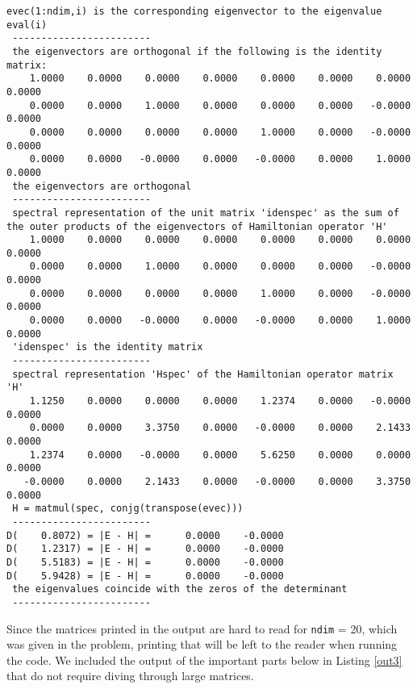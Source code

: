 \documentclass[12pt]{article}
\begin{document}
\begin{lstlisting}[frame=single,caption={Output of {\tt Fortran 90} Code {\tt hrmosc.f90} with {\tt ndim} = 4, {\tt Mass} = 2, and {\tt Omega} = $\sqrt{2}$},label=out2]
 evec(1:ndim,i) is the corresponding eigenvector to the eigenvalue eval(i)
 ------------------------
 the eigenvectors are orthogonal if the following is the identity matrix:
    1.0000    0.0000    0.0000    0.0000    0.0000    0.0000    0.0000    0.0000
    0.0000    0.0000    1.0000    0.0000    0.0000    0.0000   -0.0000    0.0000
    0.0000    0.0000    0.0000    0.0000    1.0000    0.0000   -0.0000    0.0000
    0.0000    0.0000   -0.0000    0.0000   -0.0000    0.0000    1.0000    0.0000
 the eigenvectors are orthogonal
 ------------------------
 spectral representation of the unit matrix 'idenspec' as the sum of the outer products of the eigenvectors of Hamiltonian operator 'H'
    1.0000    0.0000    0.0000    0.0000    0.0000    0.0000    0.0000    0.0000
    0.0000    0.0000    1.0000    0.0000    0.0000    0.0000   -0.0000    0.0000
    0.0000    0.0000    0.0000    0.0000    1.0000    0.0000   -0.0000    0.0000
    0.0000    0.0000   -0.0000    0.0000   -0.0000    0.0000    1.0000    0.0000
 'idenspec' is the identity matrix
 ------------------------
 spectral representation 'Hspec' of the Hamiltonian operator matrix 'H'
    1.1250    0.0000    0.0000    0.0000    1.2374    0.0000   -0.0000    0.0000
    0.0000    0.0000    3.3750    0.0000   -0.0000    0.0000    2.1433    0.0000
    1.2374    0.0000   -0.0000    0.0000    5.6250    0.0000    0.0000    0.0000
   -0.0000    0.0000    2.1433    0.0000   -0.0000    0.0000    3.3750    0.0000
 H = matmul(spec, conjg(transpose(evec)))
 ------------------------
D(    0.8072) = |E - H| =      0.0000    -0.0000
D(    1.2317) = |E - H| =      0.0000    -0.0000
D(    5.5183) = |E - H| =      0.0000    -0.0000
D(    5.9428) = |E - H| =      0.0000    -0.0000
 the eigenvalues coincide with the zeros of the determinant
 ------------------------

\end{lstlisting}

Since the matrices printed in the output are hard to read for {\tt ndim} = 20, which was given in the problem, printing that will be left to the reader when running the code.  We included the output of the important parts below in Listing \ref{out3} that do not require diving through large matrices.
\end{document}
